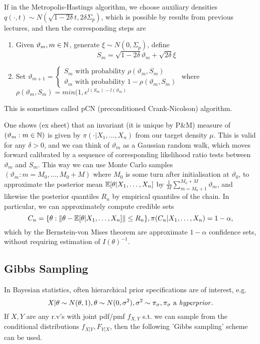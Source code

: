 \documentclass[a4paper]{article}
\begin{document}
If in the Metropolis-Hastings algorithm, we choose auxiliary densities $q(\cdot ,t) \sim N(\sqrt{1-2\delta}t, 2\delta \Sigma_p )$, which is possible by results from previous lectures, and then the corresponding steps are
\begin{enumerate}
	\item Given $\vartheta_m, m \in \mathbb{N}$, generate $\xi \sim N(0, \Sigma_p)$, define
		 \[
		S_m = \sqrt{1-2\delta} \vartheta_m + \sqrt{2\delta} \xi 
		\]
	\item Set $\vartheta_{m+1} = \begin{cases}
			S_m \text{ with probability } \rho(\vartheta_m, S_m) \\
			\vartheta_m \text{ with probability } 1 - \rho(\vartheta_m, S_m)
	\end{cases}$ 
	where $\rho(\vartheta_m, S_m) = min(1, e^{l(S_m) - l(\vartheta_m)}$
\end{enumerate}
This is sometimes called  pCN (preconditioned Crank-Nicolson) algorithm.

One shows (ex sheet) that an invariant (it is unique by P&M) measure of $(\vartheta_m: m \in \mathbb{N})$ is given by $\pi(\cdot |X_1, \ldots, X_n)$ from our target density $\mu$. This is valid for any $\delta > 0$, and we can think of $\vartheta_m$ as a Gaussian random walk, which moves forward calibrated by a sequence of corresponding likelihood ratio tests between $\vartheta_m$ and $S_m$. This way we can use Monte Carlo samples $(\vartheta_m : m=M_0, \ldots, M_0+M)$ where $M_0$ is some turn after initialisation at $\vartheta_0$, to approximate the posterior mean $\mathbb{E} [\theta |X_1,\ldots,X_n]$ by $\frac{1}{M}\sum_{m=M_0+1}^{M_0+M} \vartheta_m$, and likewise the posterior quantiles $R_n$ by empirical quantiles of the chain. In particular, we can approximately compute credible sets 
\[
	C_n = \{\theta : \|\theta - \mathbb{E} [\theta|X_1,\ldots,X_n]\| \le R_n\}, \pi(C_n|X_1,\ldots,X_n) = 1-\alpha
,\] which by the Bernstein-von Mises theorem are approximate $1-\alpha$ confidence sets, without requiring estimation of $I(\theta)^{-1}$.

\subsection{Gibbs Sampling}

In Bayesian statistics, often hierarchical prior specifications are of interest, e.g.
\[
	X|\theta \sim N(\theta,1), \theta \sim N(0, \sigma^2), \sigma^2 \sim \pi_{\sigma}, \pi_{\sigma} \text{ a \textit{hyperprior}}
.\]
If $X, Y$ are any r.v's with joint pdf/pmf $f_{X,Y}$ s.t. we can sample from the conditional distributions $f_{X|Y}, F_{Y|X}$, then the following 'Gibbs sampling' scheme can be used.
\end{document}
